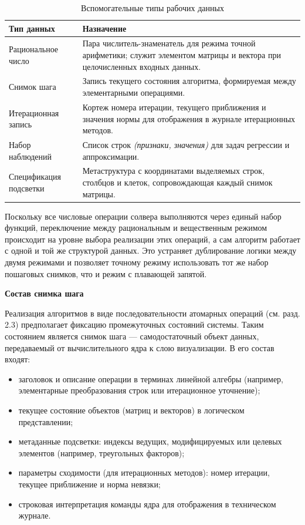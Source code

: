 \documentclass[12pt, oneside]{book}
\begin{document}
\begin{table}[htbp]
\centering
\scriptsize
\renewcommand{\arraystretch}{1.15}
\begin{tabular}{|p{4.0cm}|p{8.5cm}|}
\hline
\rowcolor{thbg} \textbf{Тип данных} & \textbf{Назначение} \\
\hline
Рациональное число & Пара числитель-знаменатель для режима точной арифметики; служит элементом матрицы и вектора при целочисленных входных данных. \\
\hline
Снимок шага & Запись текущего состояния алгоритма, формируемая между элементарными операциями. \\
\hline
Итерационная запись & Кортеж номера итерации, текущего приближения и значения нормы для отображения в журнале итерационных методов. \\
\hline
Набор наблюдений & Список строк \emph{(признаки, значения)} для задач регрессии и аппроксимации. \\
\hline
Спецификация подсветки & Метаструктура с координатами выделяемых строк, столбцов и клеток, сопровождающая каждый снимок матрицы. \\
\hline
\end{tabular}
\caption{Вспомогательные типы рабочих данных}
\label{tab:working_types}
\end{table}

    \quad Поскольку все числовые операции солвера выполняются через единый набор функций, переключение между рациональным и вещественным режимом происходит на уровне выбора реализации этих операций, а сам алгоритм работает с одной и той же структурой данных. Это устраняет дублирование логики между двумя режимами и позволяет точному режиму использовать тот же набор пошаговых снимков, что и режим с плавающей запятой.

    \vspace{0.5em}

    \textbf{\large Состав снимка шага}

    \vspace{0.5em}

    \quad Реализация алгоритмов в виде последовательности атомарных операций (см. разд. 2.3) предполагает фиксацию промежуточных состояний системы. Таким состоянием является снимок шага — самодостаточный объект данных, передаваемый от вычислительного ядра к слою визуализации. В его состав входят:

    \begin{itemize}
        \item заголовок и описание операции в терминах линейной алгебры (например, элементарные преобразования строк или итерационное уточнение);
        \item текущее состояние объектов (матриц и векторов) в логическом представлении;
        \item метаданные подсветки: индексы ведущих, модифицируемых или целевых элементов (например, треугольных факторов);
        \item параметры сходимости (для итерационных методов): номер итерации, текущее приближение и норма невязки;
        \item строковая интерпретация команды ядра для отображения в техническом журнале.
    \end{itemize}
\end{document}
